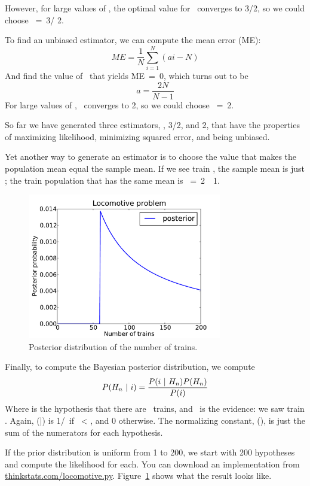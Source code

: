 \documentclass[12pt]{book}
\begin{document}
However, for large values of \N, the optimal value for \mya~converges
to 3/2, so we could choose \mynhat~=~3\ii / 2.

To find an unbiased estimator, we can compute the mean error (ME):
%
\[ ME = \frac{1}{N} \sum_{i=1}^N (ai - N) \]
%
And find the value of \mya~that yields ME~=~0, which turns out to be
%
\[ a = \frac{2N}{N-1}\]
%
For large values of \N, \mya~converges to 2, so we could choose
\mynhat~=~2\ii.

So far we have generated three estimators, \ii, 3\ii/2, and 2\ii,
that have the properties of maximizing likelihood, minimizing squared
error, and being unbiased.

Yet another way to generate an estimator is to choose the value
that makes the population mean equal the sample mean.  If we see train
\ii, the sample mean is just \ii; the train population that has the
same mean is \mynhat~=~2\ii~\minus~1.

\begin{figure}
\centerline{\includegraphics[height=2.5in]{figs/locomotive.pdf}}
\caption{Posterior distribution of the number of trains.}
\label{locomotive}
\end{figure}

Finally, to compute the Bayesian posterior distribution, we compute
%
\[ P(H_n ~|~ i) = \frac{P(i ~|~ H_n) P(H_n)}{P(i)} \]
%
Where \HH{} is the hypothesis that there are \n~trains, and \ii~is
the evidence: we saw train \ii.  Again, \Prob(\ii|\HH{})
is 1/\n~if \ii~< \n, and 0 otherwise.  The normalizing constant,
\Prob(\ii), is just the sum of the numerators for each hypothesis.

If the prior distribution is uniform from 1 to 200, we start with 200
hypotheses and compute the likelihood for each.  You can download an
implementation from
\url{thinkstats.com/locomotive.py}.  Figure~\ref{locomotive} shows
what the result looks like.
\end{document}
